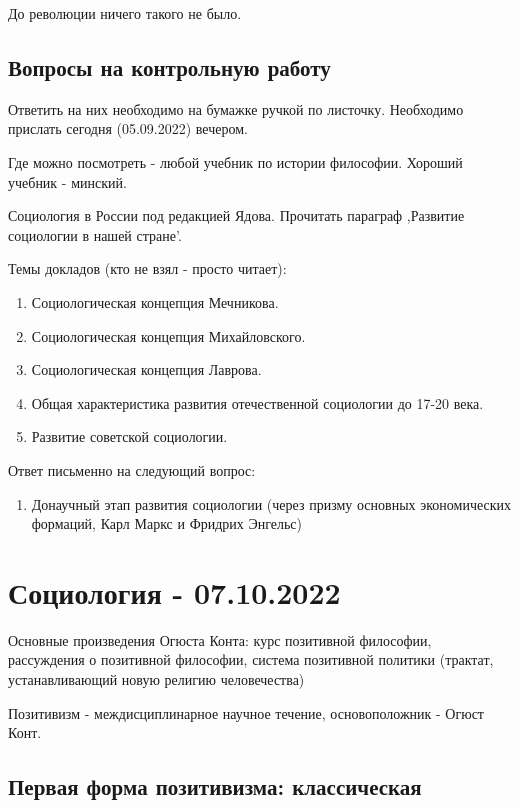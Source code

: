 \documentclass{article}
\begin{document}
До революции ничего такого не было.

\subsection{Вопросы на контрольную работу}

Ответить на них необходимо на бумажке ручкой по листочку. Необходимо прислать сегодня (05.09.2022) вечером.

Где можно посмотреть - любой учебник по истории философии. Хороший учебник - минский.

Социология в России под редакцией Ядова. Прочитать параграф ,Развитие социологии в нашей стране'.

Темы докладов (кто не взял - просто читает):

\begin{enumerate}
    \item Социологическая концепция Мечникова.
    \item Социологическая концепция Михайловского.
    \item Социологическая концепция Лаврова.
    \item Общая характеристика развития отечественной социологии до 17-20 века.
    \item Развитие советской социологии.
\end{enumerate}

Ответ письменно на следующий вопрос:

\begin{enumerate}
    \item Донаучный этап развития социологии (через призму основных экономических формаций, Карл Маркс и Фридрих Энгельс)
\end{enumerate}

\pagebreak
\section{Социология - 07.10.2022}

Основные произведения Огюста Конта: курс позитивной философии, рассуждения о позитивной философии, система позитивной политики (трактат, устанавливающий новую религию человечества)

Позитивизм - междисциплинарное научное течение, основоположник - Огюст Конт.

\subsection{Первая форма позитивизма: классическая}
\end{document}
